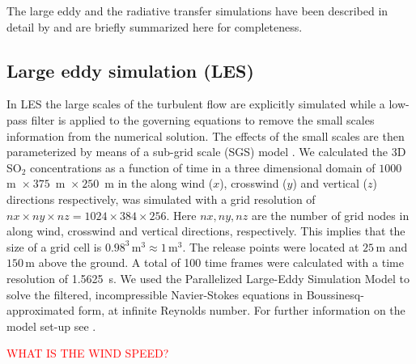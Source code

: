 \documentclass[amtd, manuscript]{copernicus}
\begin{document}
The large eddy  and the radiative transfer simulations have been
described in detail by \citet{Kylling2020} and are briefly summarized
here for completeness.

\subsection{Large eddy simulation (LES) }
\label{sec:LES}
In LES the large scales of the turbulent flow are
explicitly simulated while a low-pass filter is applied to the
governing equations to remove the small scales information from the
numerical solution. The effects of the small scales  are then
parameterized by means of a sub-grid scale (SGS) model
\citep[e.g.][]{Deardorff-1973, Moeng-1984,
  Pope-2000,Celik_etal-2009}.
We calculated the 3D SO$_2$ concentrations as a function of time in a
three dimensional domain of $1000~$m~$\times~375$~m~$\times~250$~m in
the along wind ($x$), crosswind ($y$) and vertical ($z$) directions
respectively, was simulated with a grid resolution of $nx \times ny
\times nz = 1024 \times 384 \times 256$. Here $nx, ny, nz$ are the
number of grid nodes in along wind, crosswind and vertical directions,
respectively. This implies that the size of a grid cell is $0.98^3 \,
$m$^3 \approx 1\, $m$^3$. The release points were located at $25\,$m
and $150\,$m
above the ground.  A total of 100 time frames were calculated with a
time resolution of 1.5625~s.
We used the Parallelized Large-Eddy Simulation Model \citep[PALM,
][]{Raasch2001,Maronga2015} to solve the filtered, incompressible
Navier-Stokes equations in Boussinesq-approximated form, at infinite
Reynolds number.
For further information on the model set-up see
\citet{Ardeshiri2019}.

\textcolor{red}{WHAT IS THE WIND SPEED?}
\end{document}
